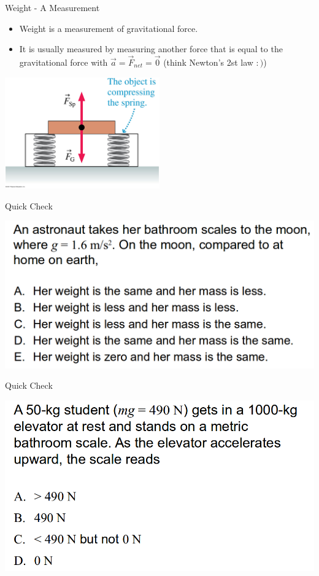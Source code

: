 \documentclass{beamer}
\newcommand{\red}[1]{{\color{red}{#1}}}
\newcommand{\checkL}[2]{\begin{textblock*}{1cm}(#1,#2){\Large \red{\Checkmark}}\end{textblock*}}
\begin{document}
\begin{frame}{Weight - A Measurement}
\begin{itemize}
   \item Weight is a measurement of gravitational force.
   \item It is usually measured by measuring another force that is equal to the gravitational force with $\vec{a}=\vec{F}_{net} = \vec{0}$ (think Newton's 2st law $:)$)
\end{itemize}
\begin{center}
   \includegraphics[width=0.5\textwidth]{../figures/06_09_Figure.jpg}
\end{center}
\end{frame}

\begin{frame}{Quick Check}
\begin{center}
   \includegraphics[width=\textwidth]{../figures/QC6_7.png}
\end{center}
\only<2>{\checkL{1.0cm}{5.3cm}}
\end{frame}

\begin{frame}{Quick Check}
\begin{center}
   \includegraphics[width=\textwidth]{../figures/QC6_8.png}
\end{center}
\only<2>{\checkL{1.0cm}{4.8cm}}
\end{frame}
\end{document}
